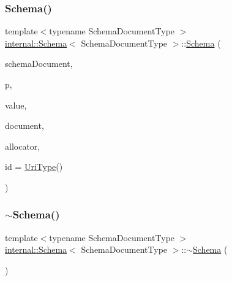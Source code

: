 \subsubsection{\texorpdfstring{Schema()}{Schema()}}
{\footnotesize\ttfamily template$<$typename Schema\+Document\+Type $>$ \\
\hyperlink{classinternal_1_1Schema}{internal\+::\+Schema}$<$ Schema\+Document\+Type $>$\+::\hyperlink{classinternal_1_1Schema}{Schema} (\begin{DoxyParamCaption}\item[{Schema\+Document\+Type $\ast$}]{schema\+Document,  }\item[{const \hyperlink{classinternal_1_1Schema_a13d7dbba6e4a77b10862546777c5aae8}{Pointer\+Type} \&}]{p,  }\item[{const \hyperlink{classinternal_1_1Schema_a8976b6d7e2a885483d0b51d941019340}{Value\+Type} \&}]{value,  }\item[{const \hyperlink{classinternal_1_1Schema_a8976b6d7e2a885483d0b51d941019340}{Value\+Type} \&}]{document,  }\item[{\hyperlink{classinternal_1_1Schema_a7af392edd81e610754cd2e6b4f82761c}{Allocator\+Type} $\ast$}]{allocator,  }\item[{const \hyperlink{classinternal_1_1Schema_a3b6cd85c3eeebe870cf8017d9d131d35}{Uri\+Type} \&}]{id = {\ttfamily \hyperlink{classinternal_1_1Schema_a3b6cd85c3eeebe870cf8017d9d131d35}{Uri\+Type}()} }\end{DoxyParamCaption})\hspace{0.3cm}{\ttfamily [inline]}}

\mbox{\label{classinternal_1_1Schema_a458f60f9fee54d74ac1f607bcf4e4ddc}} 
\subsubsection{\texorpdfstring{$\sim$\+Schema()}{~Schema()}}
{\footnotesize\ttfamily template$<$typename Schema\+Document\+Type $>$ \\
\hyperlink{classinternal_1_1Schema}{internal\+::\+Schema}$<$ Schema\+Document\+Type $>$\+::$\sim$\hyperlink{classinternal_1_1Schema}{Schema} (\begin{DoxyParamCaption}{ }\end{DoxyParamCaption})\hspace{0.3cm}{\ttfamily [inline]}}



